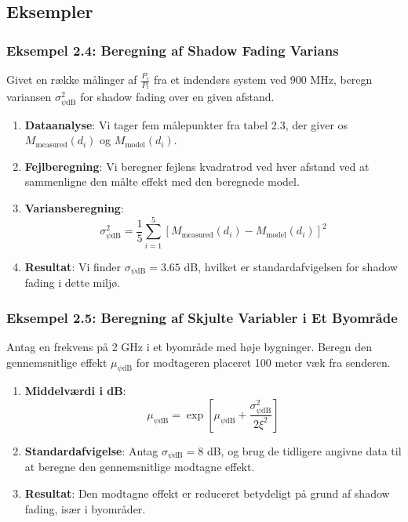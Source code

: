 \documentclass[a4paper,12pt]{book}
\begin{document}
	\subsection{Eksempler}
	
	\subsubsection{Eksempel 2.4: Beregning af Shadow Fading Varians}
	
	Givet en række målinger af \( \frac{P_r}{P_t} \) fra et indendørs system ved 900 MHz, beregn variansen \( \sigma_{\psi\text{dB}}^2 \) for shadow fading over en given afstand.
	
	\begin{enumerate}
		\item \textbf{Dataanalyse}: Vi tager fem målepunkter fra tabel 2.3, der giver os \( M_{\text{measured}}(d_i) \) og \( M_{\text{model}}(d_i) \).
		\item \textbf{Fejlberegning}: Vi beregner fejlens kvadratrod ved hver afstand ved at sammenligne den målte effekt med den beregnede model.
		\item \textbf{Variansberegning}:
		\[
		\sigma_{\psi\text{dB}}^2 = \frac{1}{5} \sum_{i=1}^{5} \left[ M_{\text{measured}}(d_i) - M_{\text{model}}(d_i) \right]^2
		\]
		\item \textbf{Resultat}: Vi finder \( \sigma_{\psi\text{dB}} = 3.65 \) dB, hvilket er standardafvigelsen for shadow fading i dette miljø.
	\end{enumerate}
	
	\subsubsection{Eksempel 2.5: Beregning af Skjulte Variabler i Et Byområde}
	
	Antag en frekvens på 2 GHz i et byområde med høje bygninger. Beregn den gennemsnitlige effekt \( \mu_{\psi\text{dB}} \) for modtageren placeret 100 meter væk fra senderen.
	
	\begin{enumerate}
		\item \textbf{Middelværdi i dB}:
		\[
		\mu_{\psi\text{dB}} = \exp \left[ \mu_{\psi\text{dB}} + \frac{\sigma_{\psi\text{dB}}^2}{2\xi^2} \right]
		\]
		\item \textbf{Standardafvigelse}: Antag \( \sigma_{\psi\text{dB}} = 8 \) dB, og brug de tidligere angivne data til at beregne den gennemsnitlige modtagne effekt.
		\item \textbf{Resultat}: Den modtagne effekt er reduceret betydeligt på grund af shadow fading, især i byområder.
	\end{enumerate}
	
\end{document}
